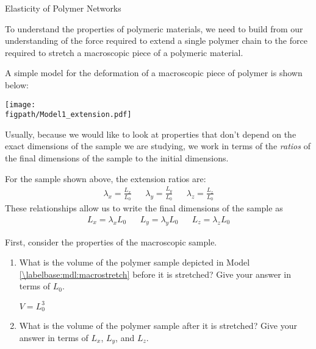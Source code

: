 \begin{activity}{Elasticity of Polymer Networks}
\begin{instructornotes}
\end{instructornotes}


\begin{model}
	\label{\labelbase:mdl:macrostretch}

	To understand the properties of polymeric materials, we need to build from our understanding of the force required to extend a single polymer chain to the force required to stretch a macroscopic piece of a polymeric material.
	
	A simple model for the deformation of a macroscopic piece of polymer is shown below:
	
	\vspace{6pt}
	\centerline{\texttt{[image: \\figpath/Model1\_extension.pdf]}}
	
	Usually, because we would like to look at properties that don't depend on the exact dimensions of the sample we are studying, we work in terms of the \emph{ratios} of the final dimensions of the sample to the initial dimensions.
	
	For the sample shown above, the extension ratios are:
	\begin{align*}
		\lambda_x = \frac{L_x}{L_0} && \lambda_y = \frac{L_y}{L_0} && \lambda_z = \frac{L_z}{L_0}
	\end{align*}
	These relationships allow us to write the final dimensions of the sample as
	\begin{align*}
		L_x = \lambda_x L_0 && L_y = \lambda_y L_0 && L_z = \lambda_z L_0
	\end{align*}
	
\end{model}


\begin{ctqs}

	\question First, consider the properties of the macroscopic sample.
	
		\begin{enumerate}
		
			\item What is the volume of the polymer sample depicted in Model \ref{\labelbase:mdl:macrostretch} before it is stretched?  Give your answer in terms of $L_0$.
	
		\begin{solution}[0.5in]
		
			$V = L_0^3$
		\end{solution}
	
			\item What is the volume of the polymer sample after it is stretched? Give your answer in terms of $L_x$, $L_y$, and $L_z$.
	

\end{enumerate}
\end{ctqs}
\end{activity}
